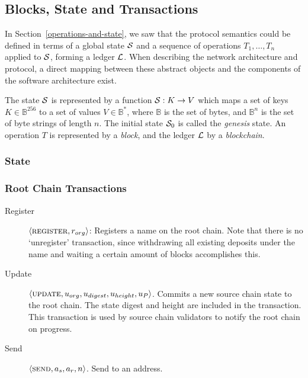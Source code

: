 \subsection{Blocks, State and Transactions}

In Section~\ref{operations-and-state}, we saw that the protocol semantics could
be defined in terms of a global state $\mathcal{S}$ and a sequence of operations
$T_1,\dots,T_n$ applied to $\mathcal{S}$, forming a ledger $\mathcal{L}$. When
describing the network architecture and protocol, a direct mapping between
these abstract objects and the components of the software architecture exist.

The state $\mathcal{S}$ is represented by a function $\mathcal{S} : K \to V$ which maps a
set of keys $K \in \mathbb{B}^{256}$ to a set of values $V \in \mathbb{B}^{*}$,
where $\mathbb{B}$ is the set of bytes, and $\mathbb{B}^n$ is the set of byte
strings of length $n$. The initial state $\mathcal{S}_0$ is called the
\emph{genesis} state. An operation $T$ is represented by a \emph{block}, and
the ledger $\mathcal{L}$ by a \emph{blockchain}.

\subsubsection{State}


\subsubsection{Root Chain Transactions}

\begin{description}
    \item[Register] $\langle \text{\normalfont\scshape register}, r_{org} \rangle$: Registers a
        name on the root chain. Note that there is no `unregister'
        transaction, since withdrawing all existing deposits under the name and
        waiting a certain amount of blocks accomplishes this.
    \item[Update] $\langle \text{\normalfont\scshape update}, u_{org}, u_{digest}, u_{height}, u_{P} \rangle$. Commits
        a new source chain state to the root chain. The state digest and height
        are included in the transaction. This transaction is used by source
        chain validators to notify the root chain on progress.
    \item[Send] $\langle \text{\normalfont\scshape send}, a_s, a_r, n \rangle$. Send \oscoin{} to an address.
\end{description}

